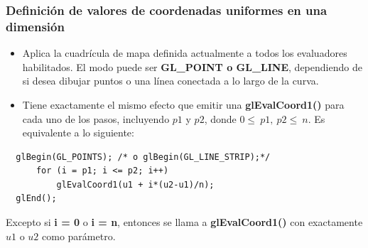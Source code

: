 \documentclass[10.5pt]{beamer}
\begin{document}
\begin{frame}[fragile]
 \frametitle{Definición de valores de coordenadas uniformes en una dimensión}

\begin{itemize}
\justifying
    \item Aplica la cuadrícula de mapa definida actualmente a todos los evaluadores habilitados. El modo puede ser \textbf{GL\_POINT o GL\_LINE}, dependiendo de si desea dibujar puntos o una línea conectada a lo largo de la curva.

    \item  Tiene exactamente el mismo efecto que emitir una \textbf{glEvalCoord1()} para cada uno de los pasos, incluyendo $p1$ y $p2$, donde $0\le\ p1,\ p2\le\ n$. Es equivalente a lo siguiente:
\end{itemize}

\begin{alertblock}{}
\small
\begin{verbatim}
  glBegin(GL_POINTS); /* o glBegin(GL_LINE_STRIP);*/
      for (i = p1; i <= p2; i++)
          glEvalCoord1(u1 + i*(u2-u1)/n);
  glEnd();
\end{verbatim}
\end{alertblock}
Excepto si \textbf{i = 0} o \textbf{i = n}, entonces se llama a \textbf{glEvalCoord1()} con exactamente $u1$ o $u2$ como parámetro.
\end{frame}
\end{document}
